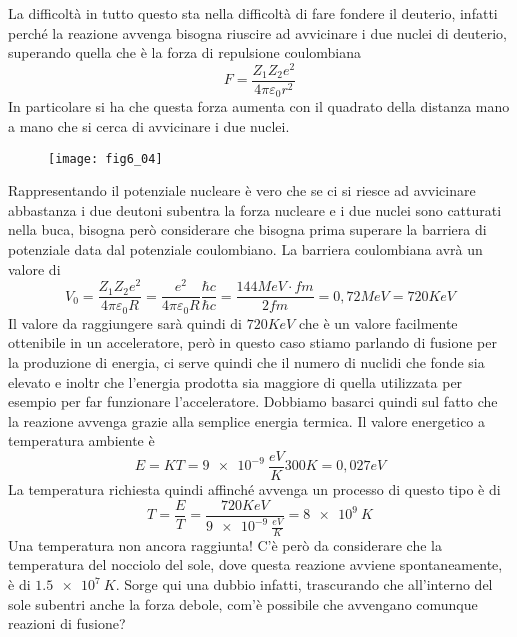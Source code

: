 La difficoltà in tutto questo sta nella difficoltà di fare fondere il deuterio, infatti perché la reazione avvenga bisogna riuscire ad avvicinare i due nuclei di deuterio, superando quella che è la forza di repulsione coulombiana 
\begin{equation}
F=\frac{Z_1Z_2e^2}{4\pi\varepsilon_0 r^2}
\end{equation}
In particolare si ha che questa forza aumenta con il quadrato della distanza mano a mano che si cerca di avvicinare i due nuclei.
\begin{figure}[h]
\centering
\texttt{[image: fig6\_04]}
\end{figure}

Rappresentando il potenziale nucleare è vero che se ci si riesce ad avvicinare abbastanza i due deutoni subentra la forza nucleare e i due nuclei sono catturati nella buca, bisogna però considerare che bisogna prima superare la barriera di potenziale data dal potenziale coulombiano. 
La barriera coulombiana avrà un valore di 
\begin{equation}
V_0=\frac{Z_1Z_2e^2}{4\pi\varepsilon_0 R}=\frac{e^2}{4\pi\varepsilon_0 R}\frac{\hbar c}{\hbar c}=\frac{144MeV\cdot fm}{2fm}=0,72MeV=720KeV
\end{equation}
Il valore da raggiungere sarà quindi di $720KeV$ che è un valore facilmente ottenibile in un acceleratore, però in questo caso stiamo parlando di fusione per la produzione di energia, ci serve quindi che il numero di nuclidi che fonde sia elevato e inoltr che l'energia prodotta sia maggiore di quella utilizzata per esempio per far funzionare l'acceleratore.
Dobbiamo basarci quindi sul fatto che la reazione avvenga grazie alla semplice energia termica. 
Il valore energetico a temperatura ambiente è
\begin{equation}
E=KT=\SI{9e-9}{\frac{eV}{K}}300K=0,027eV
\end{equation}
La temperatura richiesta quindi affinché avvenga un processo di questo tipo è di 
\begin{equation}
T=\frac{E}{T}=\frac{720KeV}{\SI{9e-9}{\frac{eV}{K}}}=\SI{8e9}{K}
\end{equation}
Una temperatura non ancora raggiunta! 
C'è però da considerare che la temperatura del nocciolo del sole, dove questa reazione avviene spontaneamente, è di $\SI{1,5e7}{K}$. 
Sorge qui una dubbio infatti, trascurando che all'interno del sole subentri anche la forza debole, com'è possibile che avvengano comunque reazioni di fusione?

